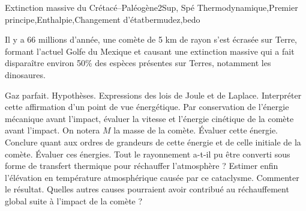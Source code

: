 \begin{exercise}{Extinction massive du Crétacé--Paléogène}{2}{Sup, Spé}
{Thermodynamique,Premier principe,Enthalpie,Changement d'état}{bermudez,bedo}

Il y a 66 millions d'année, une comète de 5 km de rayon s'est écrasée sur Terre, formant l'actuel Golfe du Mexique et causant une extinction massive qui a fait disparaître environ 50\% des espèces présentes sur Terres, notamment les dinosaures.

\begin{questions}
    \questioncours Gaz parfait. Hypothèses. Expressions des lois de Joule et de Laplace.
    \question Interpréter cette affirmation d'un point de vue énergétique.
    \question Par conservation de l'énergie mécanique avant l'impact, évaluer la vitesse et l'énergie cinétique de la comète avant l'impact. On notera $M$ la masse de la comète.
    \question \'Evaluer cette énergie. Conclure quant aux ordres de grandeurs de cette énergie et de celle initiale de la comète.
    \question \'Evaluer ces énergies.
    \question Tout le rayonnement a-t-il pu être converti sous forme de transfert thermique pour réchauffer l'atmosphère ?
    \question Estimer enfin l'élévation en température atmosphérique causée par ce cataclysme.
    \question Commenter le résultat. Quelles autres causes pourraient avoir contribué au réchauffement global suite à l'impact de la comète ?
\end{questions}


\end{exercise}
